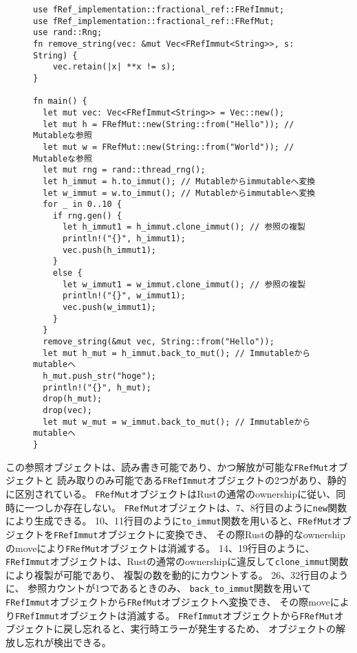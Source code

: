 \documentclass{sumiilab-paper}
\theoremstyle{mystyle}
\numberwithin{definition}{chapter} %
\begin{document}
\begin{figure}[htp]
\begin{lstlisting}[caption=新たな参照オブジェクトを用いた柔軟なメモリ管理の例, 
  label=random_example, captionpos=b]
use fRef_implementation::fractional_ref::FRefImmut;
use fRef_implementation::fractional_ref::FRefMut;
use rand::Rng;
fn remove_string(vec: &mut Vec<FRefImmut<String>>, s: String) {
    vec.retain(|x| **x != s);
}

fn main() {
  let mut vec: Vec<FRefImmut<String>> = Vec::new();
  let mut h = FRefMut::new(String::from("Hello")); // Mutableな参照
  let mut w = FRefMut::new(String::from("World")); // Mutableな参照
  let mut rng = rand::thread_rng();
  let h_immut = h.to_immut(); // Mutableからimmutableへ変換
  let w_immut = w.to_immut(); // Mutableからimmutableへ変換
  for _ in 0..10 {
    if rng.gen() {
      let h_immut1 = h_immut.clone_immut(); // 参照の複製
      println!("{}", h_immut1);
      vec.push(h_immut1);
    }
    else {
      let w_immut1 = w_immut.clone_immut(); // 参照の複製
      println!("{}", w_immut1);
      vec.push(w_immut1);
    }
  }
  remove_string(&mut vec, String::from("Hello"));
  let mut h_mut = h_immut.back_to_mut(); // Immutableからmutableへ
  h_mut.push_str("hoge");
  println!("{}", h_mut);
  drop(h_mut);
  drop(vec);
  let mut w_mut = w_immut.back_to_mut(); // Immutableからmutableへ
}
\end{lstlisting}
\end{figure}

この参照オブジェクトは、読み書き可能であり、かつ解放が可能な\texttt{FRefMut}オブジェクトと
読み取りのみ可能である\texttt{FRefImmut}オブジェクトの2つがあり、静的に区別されている。
\texttt{FRefMut}オブジェクトはRustの通常のownershipに従い、同時に一つしか存在しない。
\texttt{FRefMut}オブジェクトは、7、8行目のように\texttt{new}関数により生成できる。
10、11行目のように\texttt{to\_immut}関数を用いると、\texttt{FRefMut}オブジェクトを\texttt{FRefImmut}オブジェクトに変換でき、
その際Rustの静的なownershipのmoveにより\texttt{FRefMut}オブジェクトは消滅する。
14、19行目のように、
\texttt{FRefImmut}オブジェクトは、Rustの通常のownershipに違反して\texttt{clone\_immut}関数により複製が可能であり、
複製の数を動的にカウントする。
26、32行目のように、
参照カウントが1つであるときのみ、
\texttt{back\_to\_immut}関数を用いて\texttt{FRefImmut}オブジェクトから\texttt{FRefMut}オブジェクトへ変換でき、
その際moveにより\texttt{FRefImmut}オブジェクトは消滅する。
\texttt{FRefImmut}オブジェクトから\texttt{FRefMut}オブジェクトに戻し忘れると、実行時エラーが発生するため、
オブジェクトの解放し忘れが検出できる。
\end{document}
